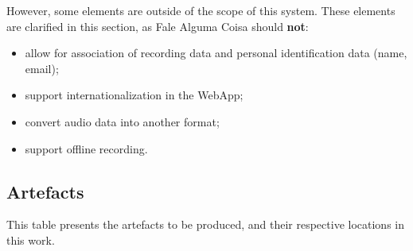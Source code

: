 However, some elements are outside of the scope of this system. These elements are clarified in this section, as Fale Alguma Coisa should \textbf{not}:
\begin{itemize}
    \item allow for association of recording data and personal identification data (name, email);
    \item support internationalization in the WebApp;
    \item convert audio data into another format;
    \item support offline recording.
\end{itemize}

\subsection{Artefacts}
\label{sec:app-artefacts}

This table presents the artefacts to be produced, and their respective locations in this work.

